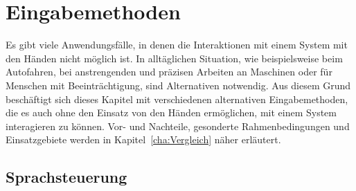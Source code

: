 \chapter{Eingabemethoden}
\label{cha:Eingabe}

Es gibt viele Anwendungsfälle, in denen die Interaktionen mit einem System mit den Händen nicht möglich ist. In alltäglichen Situation, wie beispielsweise beim Autofahren, bei anstrengenden und präzisen Arbeiten an Maschinen oder für Menschen mit Beeinträchtigung, sind Alternativen notwendig. Aus diesem Grund beschäftigt sich dieses Kapitel mit verschiedenen alternativen Eingabemethoden, die es auch ohne den Einsatz von den Händen ermöglichen, mit einem System interagieren zu können. Vor- und Nachteile, gesonderte Rahmenbedingungen und Einsatzgebiete werden in Kapitel~\ref{cha:Vergleich} näher erläutert. 

\section{Sprachsteuerung}

